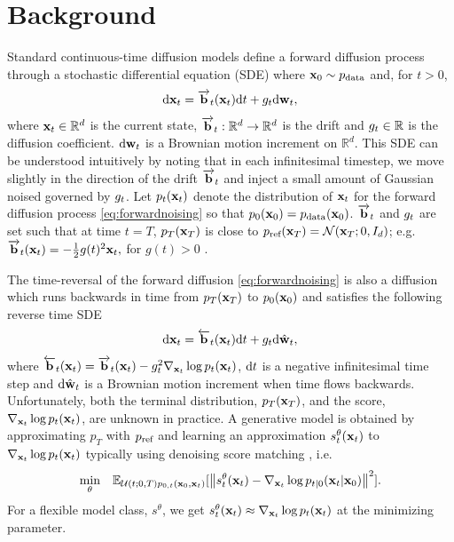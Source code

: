 \section{Background}
Standard continuous-time diffusion models \cite{song2020score,huang2021variational,karraselucidating2022,benton2022denoising}  define a forward diffusion process through a stochastic differential equation (SDE) where ${\mathbf{x}}_0 \sim p_{\rm{data}}$ and, for $t>0$,
\begin{equation}\label{eq:forwardnoising}
     \mathrm{d} {\mathbf{x}}_t = \overrightarrow{\mathbf{b}}_t({\mathbf{x}}_t) \mathrm{d} t + g_t \mathrm{d} \mathbf{w}_t,
\end{equation}
where ${\mathbf{x}}_t \in \mathbb{R}^d$ is the current state, $\overrightarrow{\mathbf{b}}_t: \mathbb{R}^d \rightarrow \mathbb{R}^d$ is the drift and $g_t \in \mathbb{R}$ is the diffusion coefficient. $ \mathrm{d} \mathbf{w}_t$ is a Brownian motion increment on $\mathbb{R}^d$. This SDE can be understood intuitively by noting that in each infinitesimal timestep, we move slightly in the direction of the drift $\overrightarrow{\mathbf{b}}_t$ and inject a small amount of Gaussian noised governed by $g_t$.
Let $p_t({\mathbf{x}}_t)$ denote the distribution of ${\mathbf{x}}_t$ for the forward diffusion process \eqref{eq:forwardnoising} so that $p_0({\mathbf{x}}_0) = p_{\rm{data}}({\mathbf{x}}_0)$. $\overrightarrow{\mathbf{b}}_t$ and $g_t$ are set such that at time $t=T$, $p_T({\mathbf{x}}_T)$ is close to $p_{\textup{ref}}({\mathbf{x}}_T)= \mathcal{N}({\mathbf{x}}_T;0, I_d)$; e.g. $\overrightarrow{\mathbf{b}}_t({\mathbf{x}}_t)=-\frac{1}{2}g(t)^2 {\mathbf{x}}_t,$ for $g(t)>0$ \cite{ho2020denoising, song2020score}.

The time-reversal of the forward diffusion \eqref{eq:forwardnoising} is also a diffusion \cite{anderson1982reverse, haussmann1986time} which runs backwards in time from $p_T({\mathbf{x}}_T)$ to $p_0({\mathbf{x}}_0)$ and satisfies the following reverse time SDE
\begin{equation}
     \mathrm{d} {\mathbf{x}}_t = \overleftarrow{\mathbf{b}}_t({\mathbf{x}}_t) \mathrm{d} t + g_t \mathrm{d} \hat{\mathbf{w}}_t,
\end{equation}
where $\overleftarrow{\mathbf{b}}_t({\mathbf{x}}_t) = \overrightarrow{\mathbf{b}}_t({\mathbf{x}}_t) - g_t^2 \nabla_{{\mathbf{x}}_t} \log p_t({\mathbf{x}}_t)$, $\mathrm{d} t$ is a negative infinitesimal time step and $\mathrm{d} \hat{\mathbf{w}}_t$ is a Brownian motion increment when time flows backwards. 
Unfortunately, both the terminal distribution, $p_T({\mathbf{x}}_T)$, and the score, $\nabla_{{\mathbf{x}}_t} \log p_{t}({\mathbf{x}}_t)$, are unknown in practice.
A generative model is obtained by approximating $p_T$ with $p_{\textup{ref}}$ and learning an approximation $s^\theta_{t}({\mathbf{x}}_t)$ to $\nabla_{{\mathbf{x}}_t} \log p_{t}({\mathbf{x}}_t)$ typically using denoising score matching \cite{vincent2011connection}, i.e. 
\begin{equation}
    \underset{\theta}{\text{min}} \quad \mathbb{E}_{\mathcal{U}(t; 0, T) p_{0,t}({\mathbf{x}}_0, {\mathbf{x}}_t)} [ \left\lVert s^\theta_t({\mathbf{x}}_t) - \nabla_{{\mathbf{x}}_t} \log p_{t|0}({\mathbf{x}}_t | {\mathbf{x}}_0)\right\rVert^2 ].
    \label{eq:dsm}
\end{equation}
For a flexible model class, $s^\theta$, we get $s^\theta_t({\mathbf{x}}_t) \approx \nabla_{{\mathbf{x}}_t} \log p_t({\mathbf{x}}_t)$ at the minimizing parameter.

